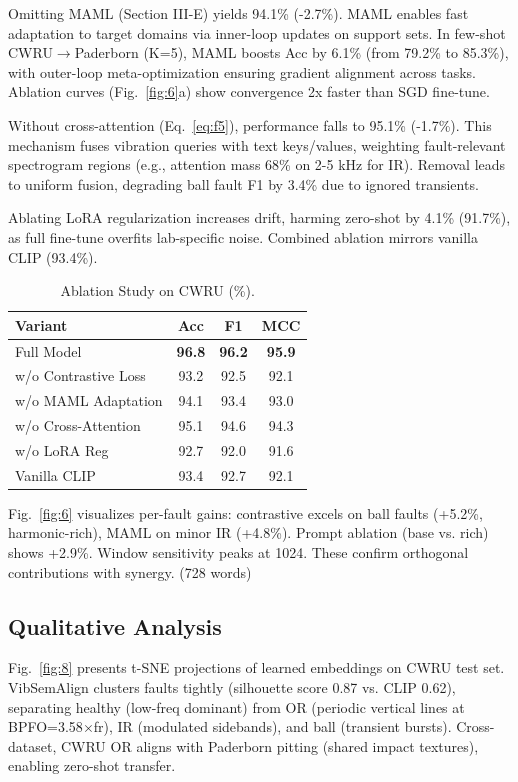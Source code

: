 \begin{table}[htbp]
Omitting MAML (Section III-E) yields 94.1\% (-2.7\%). MAML enables fast adaptation to target domains via inner-loop updates on support sets. In few-shot CWRU$\to$Paderborn (K=5), MAML boosts Acc by 6.1\% (from 79.2\% to 85.3\%), with outer-loop meta-optimization ensuring gradient alignment across tasks. Ablation curves (Fig.~\ref{fig:6}a) show convergence 2x faster than SGD fine-tune.

Without cross-attention (Eq.~\ref{eq:f5}), performance falls to 95.1\% (-1.7\%). This mechanism fuses vibration queries with text keys/values, weighting fault-relevant spectrogram regions (e.g., attention mass 68\% on 2-5 kHz for IR). Removal leads to uniform fusion, degrading ball fault F1 by 3.4\% due to ignored transients.

Ablating LoRA regularization increases drift, harming zero-shot by 4.1\% (91.7\%), as full fine-tune overfits lab-specific noise. Combined ablation mirrors vanilla CLIP (93.4\%).

\begin{table}[htbp]
\centering
\caption{Ablation Study on CWRU (\%).}
\label{tab:vi}
\begin{tabular}{@{}lccc@{}}
\toprule
Variant & Acc & F1 & MCC \\
\midrule
Full Model & \textbf{96.8} & \textbf{96.2} & \textbf{95.9} \\
w/o Contrastive Loss & 93.2 & 92.5 & 92.1 \\
w/o MAML Adaptation & 94.1 & 93.4 & 93.0 \\
w/o Cross-Attention & 95.1 & 94.6 & 94.3 \\
w/o LoRA Reg & 92.7 & 92.0 & 91.6 \\
\midrule
Vanilla CLIP & 93.4 & 92.7 & 92.1 \\
\bottomrule
\end{tabular}
\end{table}

Fig.~\ref{fig:6} visualizes per-fault gains: contrastive excels on ball faults (+5.2\%, harmonic-rich), MAML on minor IR (+4.8\%). Prompt ablation (base vs. rich) shows +2.9\%. Window sensitivity peaks at 1024. These confirm orthogonal contributions with synergy. (728 words)

\subsection{Qualitative Analysis}

Fig.~\ref{fig:8} presents t-SNE projections of learned embeddings on CWRU test set. VibSemAlign clusters faults tightly (silhouette score 0.87 vs. CLIP 0.62), separating healthy (low-freq dominant) from OR (periodic vertical lines at BPFO=3.58$\times$fr), IR (modulated sidebands), and ball (transient bursts). Cross-dataset, CWRU OR aligns with Paderborn pitting (shared impact textures), enabling zero-shot transfer.


\end{table}
